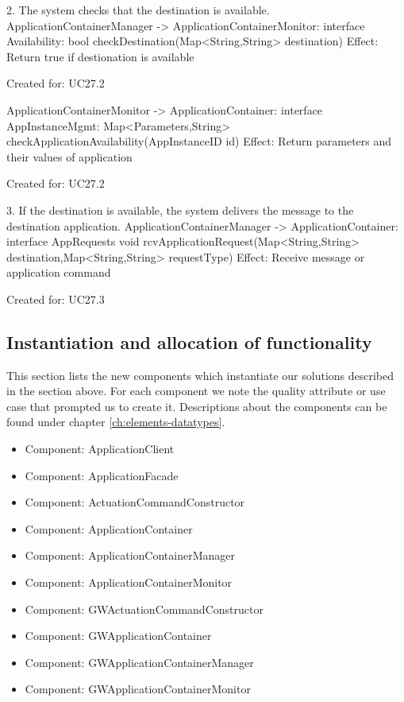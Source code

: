         2. The system checks that the destination is available.
            ApplicationContainerManager -> ApplicationContainerMonitor: interface Availability:
                                                bool checkDestination(Map<String,String>  destination)
                   Effect: Return true if destionation is available
                   \item Created for: UC27.2

            ApplicationContainerMonitor -> ApplicationContainer: interface AppInstanceMgmt:
            Map<Parameters,String> checkApplicationAvailability(AppInstanceID id)
                    Effect: Return parameters and their values of application
                   \item Created for: UC27.2

        3. If the destination is available, the system delivers the message to the destination application.
            ApplicationContainerManager -> ApplicationContainer: interface AppRequests
                               void rcvApplicationRequest(Map<String,String> destination,Map<String,String> requestType)
                   Effect: Receive message or application command
                   \item Created for: UC27.3

\subsection{Instantiation and allocation of functionality}
    This section lists the new components which instantiate our solutions
    described in the section above. For each component we note the quality
    attribute or use case that prompted us to create it. Descriptions about
    the components can be found under chapter \ref{ch:elements-datatypes}. \\

    \begin{itemize}
        \item Component: ApplicationClient
        \item Component: ApplicationFacade
        \item Component: ActuationCommandConstructor
        \item Component: ApplicationContainer
        \item Component: ApplicationContainerManager
        \item Component: ApplicationContainerMonitor
        \item Component: GWActuationCommandConstructor
        \item Component: GWApplicationContainer
        \item Component: GWApplicationContainerManager
        \item Component: GWApplicationContainerMonitor
    \end{itemize}


